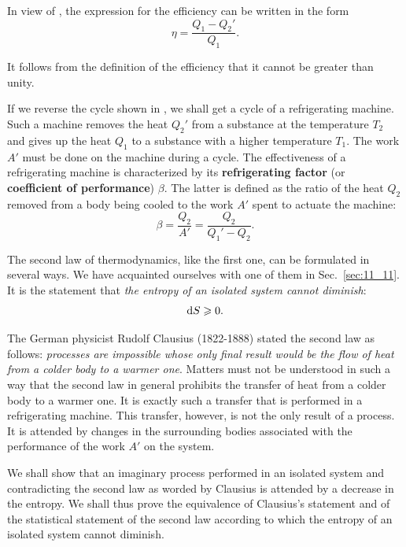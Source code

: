 \noindent
In view of , the expression for the efficiency can be written in the form
\begin{equation}\label{eq:12_5}
	\eta = \frac{Q_1 - Q_2'}{Q_1}.
\end{equation}

\noindent
It follows from the definition of the efficiency that it cannot be greater than unity.

If we reverse the cycle shown in , we shall get a cycle of a refrigerating machine. Such a machine removes the heat $Q_2'$ from a substance at the temperature $T_2$ and gives up the heat $Q_1$ to a substance with a higher temperature $T_1$. The work $A'$ must be done on the machine during a cycle. The effectiveness of a refrigerating machine is characterized by its \textbf{refrigerating factor} (or \textbf{coefficient of performance}) $\beta$. The latter is defined as the ratio of the heat $Q_2$ removed from a body being cooled to the work $A'$ spent to actuate the machine:
\begin{equation}\label{eq:12_6}
	\beta = \frac{Q_2}{A'} = \frac{Q_2}{Q_1' - Q_2}.
\end{equation}

The second law of thermodynamics, like the first one, can be formulated in several ways. We have acquainted ourselves with one of them in Sec.~\ref{sec:11_11}. It is the statement that \textit{the entropy of an isolated system cannot diminish}:
\begin{equation}\label{eq:12_7}
	\mathrm{d} S \geqslant 0.
\end{equation}

The German physicist Rudolf Clausius (1822-1888) stated the second law as follows: \textit{processes are impossible whose only final result would be the flow of heat from a colder body to a warmer one}. Matters must not be understood in such a way that the second law in general prohibits the transfer of heat from a colder body to a warmer one. It is exactly such a transfer that is performed in a refrigerating machine. This transfer, however, is not the only result of a process. It is attended by changes in the surrounding bodies associated with the performance of the work $A'$ on the system.

We shall show that an imaginary process performed in an isolated system and contradicting the second law as worded by Clausius is attended by a decrease in the entropy. We shall thus prove the equivalence of Clausius's statement and of the statistical statement of the second law according to which the entropy of an isolated system cannot diminish.

